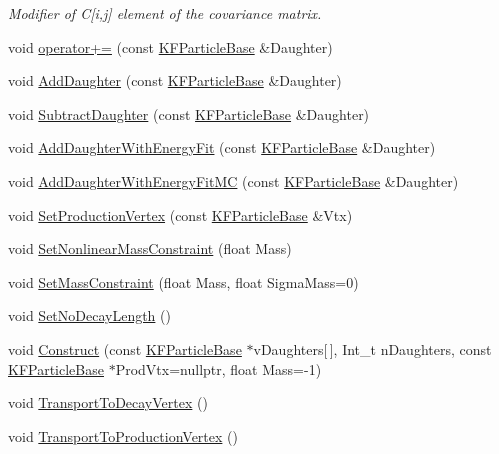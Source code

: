 \begin{DoxyCompactItemize}
\begin{DoxyCompactList}\small\item\em Modifier of C\mbox{[}i,j\mbox{]} element of the covariance matrix. \end{DoxyCompactList}\item 
void \hyperlink{classKFParticleBase_a907713f54a19f44caf8873a99dc51e48}{operator+=} (const \hyperlink{classKFParticleBase}{K\+F\+Particle\+Base} \&Daughter)
\item 
void \hyperlink{classKFParticleBase_a24a5ddb6e508939d630fdbeffb5cae30}{Add\+Daughter} (const \hyperlink{classKFParticleBase}{K\+F\+Particle\+Base} \&Daughter)
\item 
void \hyperlink{classKFParticleBase_ab84556dd6a10db1f6f9c5be93bc958b2}{Subtract\+Daughter} (const \hyperlink{classKFParticleBase}{K\+F\+Particle\+Base} \&Daughter)
\item 
void \hyperlink{classKFParticleBase_afe25065680801ce33287e480ca0534e4}{Add\+Daughter\+With\+Energy\+Fit} (const \hyperlink{classKFParticleBase}{K\+F\+Particle\+Base} \&Daughter)
\item 
void \hyperlink{classKFParticleBase_a143d70c6bd591a3294c4c0f89c8edcda}{Add\+Daughter\+With\+Energy\+Fit\+MC} (const \hyperlink{classKFParticleBase}{K\+F\+Particle\+Base} \&Daughter)
\item 
void \hyperlink{classKFParticleBase_a0ed85901f073ae1c6011ed7f216644d7}{Set\+Production\+Vertex} (const \hyperlink{classKFParticleBase}{K\+F\+Particle\+Base} \&Vtx)
\item 
void \hyperlink{classKFParticleBase_ac90aba4ed098945e147f1e28bb592555}{Set\+Nonlinear\+Mass\+Constraint} (float Mass)
\item 
void \hyperlink{classKFParticleBase_ab6aedf51539e2164935c6469e6b0d374}{Set\+Mass\+Constraint} (float Mass, float Sigma\+Mass=0)
\item 
void \hyperlink{classKFParticleBase_ad0c24d81f0702a7b1f3204c8f73a8e89}{Set\+No\+Decay\+Length} ()
\item 
void \hyperlink{classKFParticleBase_abc1f77ca63ec7497a457e48edec2e3fd}{Construct} (const \hyperlink{classKFParticleBase}{K\+F\+Particle\+Base} $\ast$v\+Daughters\mbox{[}$\,$\mbox{]}, Int\+\_\+t n\+Daughters, const \hyperlink{classKFParticleBase}{K\+F\+Particle\+Base} $\ast$Prod\+Vtx=nullptr, float Mass=-\/1)
\item 
void \hyperlink{classKFParticleBase_af6de8b429c89b13c29f7f8d9f6aa24c7}{Transport\+To\+Decay\+Vertex} ()
\item 
void \hyperlink{classKFParticleBase_ab33bc7d9a1d4e8c38075c37308f5b1f6}{Transport\+To\+Production\+Vertex} ()

\end{DoxyCompactItemize}
